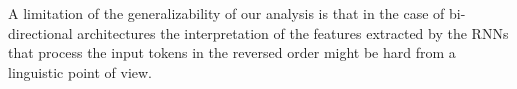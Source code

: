 A limitation of the generalizability of our 
analysis is that in the case of 
bi-directional architectures the interpretation of the features
extracted by the RNNs that process the input tokens in the reversed order
might be hard from a linguistic point of view. 





